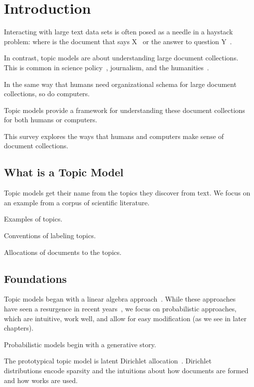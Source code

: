 
\chapter{Introduction}
\label{ch:intro}

Interacting with large text data sets is often posed as a needle in a
haystack problem: where is the document that says X~\citep{Salton-68} or the answer to
question Y~\citep{Hirschman-01}.

In contrast, topic models are about understanding large document
collections.  This is common in science policy~\citep{talley-11}, journalism, and the
humanities~\citep{moretti-13}.

In the same way that humans need organizational schema for large
document collections, so do computers.

Topic models provide a framework for understanding these document
collections for both humans or computers.

This survey explores the ways that humans and computers make sense of
document collections.

\section{What is a Topic Model}

Topic models get their name from the topics they discover from text.
We focus on an example from a corpus of scientific literature.

Examples of topics.

Conventions of labeling topics.

Allocations of documents to the topics.

\section{Foundations}

Topic models began with a linear algebra
approach~\citep{deerwester-90}.  While these approaches have seen a
resurgence in recent years~\citep{anandkumar-12:lda,arora-13}, we focus
on probabilistic approaches, which are intuitive, work well, and allow
for easy modification (as we see in later chapters).

Probabilistic models begin with a generative story.

The prototypical topic model is latent Dirichlet
allocation~\citep{blei-03}.  Dirichlet distributions encode sparsity
and the intuitions about how documents are formed and how works are
used.

